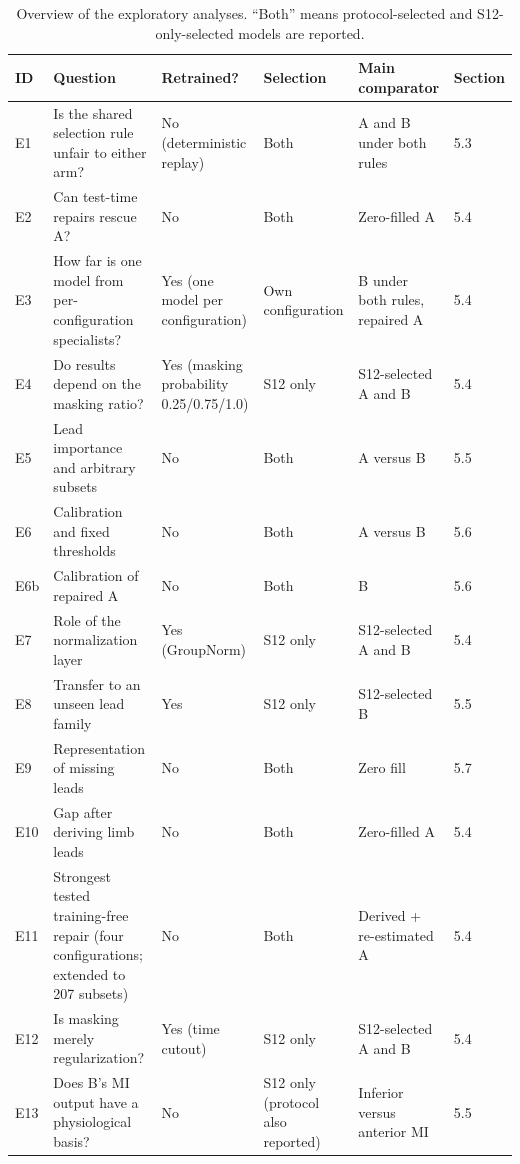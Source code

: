 \begin{table}[htbp]
\centering\footnotesize
\caption{Overview of the exploratory analyses. ``Both'' means protocol-selected and S12-only-selected models are reported.}
\label{tab:analyses}
\setlength{\tabcolsep}{3pt}
\begin{tabular}{L{0.7cm}L{4.3cm}L{2.2cm}L{1.6cm}L{2.5cm}L{0.9cm}}
\toprule
ID & Question & Retrained? & Selection & Main comparator & Section \\
\midrule
E1 & Is the shared selection rule unfair to either arm? & No (deterministic replay) & Both & A and B under both rules & 5.3 \\
E2 & Can test-time repairs rescue A? & No & Both & Zero-filled A & 5.4 \\
E3 & How far is one model from per-configuration specialists? & Yes (one model per configuration) & Own configuration & B under both rules, repaired A & 5.4 \\
E4 & Do results depend on the masking ratio? & Yes (masking probability 0.25/0.75/1.0) & S12 only & S12-selected A and B & 5.4 \\
E5 & Lead importance and arbitrary subsets & No & Both & A versus B & 5.5 \\
E6 & Calibration and fixed thresholds & No & Both & A versus B & 5.6 \\
E6b & Calibration of repaired A & No & Both & B & 5.6 \\
E7 & Role of the normalization layer & Yes (GroupNorm) & S12 only & S12-selected A and B & 5.4 \\
E8 & Transfer to an unseen lead family & Yes & S12 only & S12-selected B & 5.5 \\
E9 & Representation of missing leads & No & Both & Zero fill & 5.7 \\
E10 & Gap after deriving limb leads & No & Both & Zero-filled A & 5.4 \\
E11 & Strongest tested training-free repair (four configurations; extended to 207 subsets) & No & Both & Derived + re-estimated A & 5.4 \\
E12 & Is masking merely regularization? & Yes (time cutout) & S12 only & S12-selected A and B & 5.4 \\
E13 & Does B's MI output have a physiological basis? & No & S12 only (protocol also reported) & Inferior versus anterior MI & 5.5 \\
\bottomrule
\end{tabular}
\end{table}

